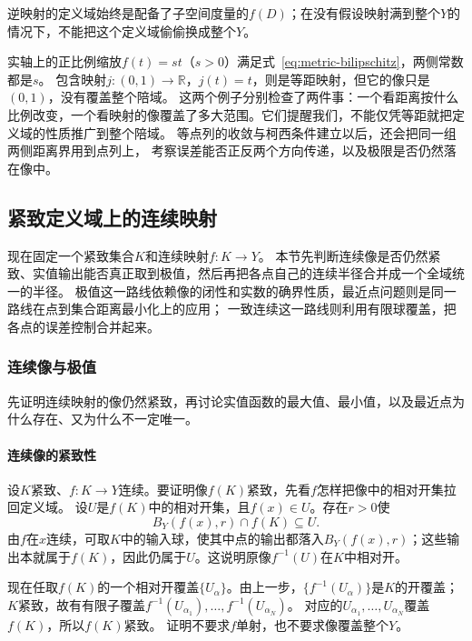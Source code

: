 逆映射的定义域始终是配备了子空间度量的$f(D)$；在没有假设映射满到整个$Y$的情况下，不能把这个定义域偷偷换成整个$Y$。

实轴上的正比例缩放$f(t)=st$（$s>0$）满足式~\eqref{eq:metric-bilipschitz}，两侧常数都是$s$。
包含映射$j:(0,1)\to\mathbb R$，$j(t)=t$，则是等距映射，但它的像只是$(0,1)$，没有覆盖整个陪域。
这两个例子分别检查了两件事：一个看距离按什么比例改变，一个看映射的像覆盖了多大范围。它们提醒我们，不能仅凭等距就把定义域的性质推广到整个陪域。
等点列的收敛与柯西条件建立以后，还会把同一组两侧距离界用到点列上，
考察误差能否正反两个方向传递，以及极限是否仍然落在像中。

\subsection{紧致定义域上的连续映射}
\label{sec:metric-compactness-consequences}

现在固定一个紧致集合$K$和连续映射$f:K\to Y$。
本节先判断连续像是否仍然紧致、实值输出能否真正取到极值，然后再把各点自己的连续半径合并成一个全域统一的半径。
极值这一路线依赖像的闭性和实数的确界性质，最近点问题则是同一路线在点到集合距离最小化上的应用；
一致连续这一路线则利用有限球覆盖，把各点的误差控制合并起来。

\subsubsection{连续像与极值}
\label{sec:metric-continuous-images-extrema}

先证明连续映射的像仍然紧致，再讨论实值函数的最大值、最小值，以及最近点为什么存在、又为什么不一定唯一。

\paragraph{连续像的紧致性}

设$K$紧致、$f:K\to Y$连续。要证明像$f(K)$紧致，先看$f$怎样把像中的相对开集拉回定义域。
设$U$是$f(K)$中的相对开集，且$f(x)\in U$。存在$r>0$使
\[
  B_Y(f(x),r)\cap f(K)\subseteq U.
\]
由$f$在$x$连续，可取$K$中的输入球，使其中点的输出都落入$B_Y(f(x),r)$；这些输出本就属于$f(K)$，因此仍属于$U$。这说明原像$f^{-1}(U)$在$K$中相对开。

现在任取$f(K)$的一个相对开覆盖$\{U_\alpha\}$。由上一步，$\{f^{-1}(U_\alpha)\}$是$K$的开覆盖；
$K$紧致，故有有限子覆盖$f^{-1}(U_{\alpha_1}),\ldots,f^{-1}(U_{\alpha_N})$。
对应的$U_{\alpha_1},\ldots,U_{\alpha_N}$覆盖$f(K)$，所以$f(K)$紧致。
证明不要求$f$单射，也不要求像覆盖整个$Y$。

